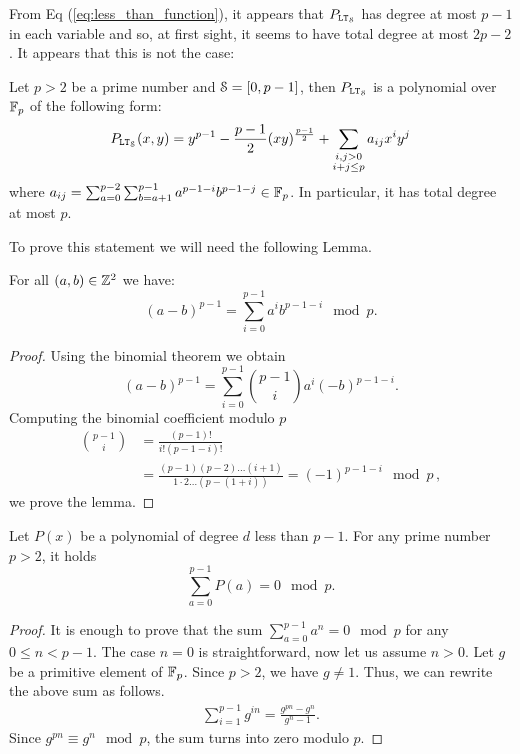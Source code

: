   From Eq (\ref{eq:less_than_function}), it appears that $P_{\LT_\S}$ has degree at most $p-1$ in each variable and so, at first sight, it seems to have total degree at most $2p - 2$. It appears that this is not the case:
  \begin{theorem} \label{thm:less_than_total_degree}
    Let $p>2$ be a prime number and $\S = [0,p-1]$, then $P_{\LT_\S}$ is a polynomial over $\F_p$ of the following form:
    \begin{align*}
      P_{\LT_\S}(x,y) = y^{p-1} - \frac{p-1}{2} (xy)^{\frac{p-1}{2}} + \sum_{\substack{i,j>0 \\ i+j \le p}} a_{ij} x^i y^j 
    \end{align*}
    where $a_{ij} = \sum_{a=0}^{p-2} \sum_{b=a+1}^{p-1} a^{p-1-i} b^{p-1-j} \in \F_p$. In particular, it has total degree at most $p$.
  \end{theorem}

  To prove this statement we will need the following Lemma.

  \begin{lemma}\label{lem:difference_to_p-1}
    For all $(a,b)\in\Z^2$ we have:
    \[
      (a - b)^{p-1} = \sum_{i=0}^{p-1} a^i b^{p-1-i} \mod p.
    \]
  \end{lemma}
  \begin{proof}
    Using the binomial theorem we obtain
    \[
      (a - b)^{p-1} = \sum_{i=0}^{p-1} \binom{p-1}{i} a^i (-b)^{p-1-i}.
    \]
    Computing the binomial coefficient modulo $p$
    \begin{align*}
      \binom{p-1}{i} & = \frac{(p-1)!}{i! (p-1-i)!} \\
      & = \frac{(p-1)(p-2)\dots(i+1)}{1 \cdot 2 \dots (p-(1+i))} = (-1)^{p-1-i} \mod p\,,
    \end{align*}
    we prove the lemma.
  \end{proof}

  \begin{lemma}\label{lem:sum_poly}
    Let $P(x)$ be a polynomial of degree $d$ less than $p-1$.
    For any prime number $p > 2$, it holds
    \[
      \sum_{a=0}^{p-1} P(a) = 0 \mod p.
    \]
  \end{lemma}
  \begin{proof}
    It is enough to prove that the sum $\sum_{a=0}^{p-1} a^n = 0 \mod p$ for any $0 \leq n < p-1$. The case $n=0$ is straightforward, now let us assume $n>0$. Let $g$ be a primitive element of $\F_p$.
    Since $p > 2$, we have $g \ne 1$.
    Thus, we can rewrite the above sum as follows.
    \begin{align}
      \sum_{i=1}^{p-1} g^{in} = \frac{g^{pn} - g^n}{g^n - 1}.
    \end{align}
    Since $g^{pn} \equiv g^n \mod p$, the sum turns into zero modulo $p$.
  \end{proof}

